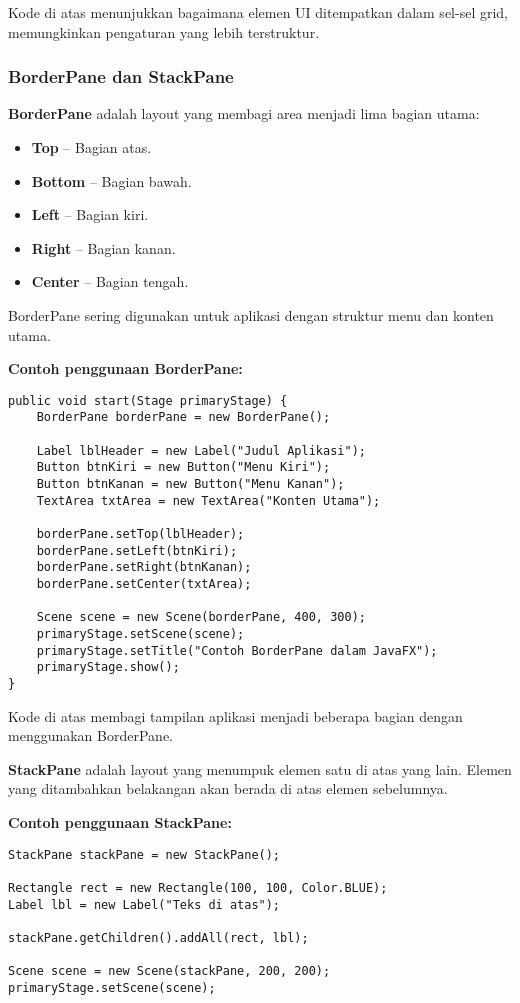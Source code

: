 Kode di atas menunjukkan bagaimana elemen UI ditempatkan dalam sel-sel grid, memungkinkan pengaturan yang lebih terstruktur.

\subsubsection{BorderPane dan StackPane}

\textbf{BorderPane} adalah layout yang membagi area menjadi lima bagian utama:
\begin{itemize}
\item \textbf{Top} – Bagian atas.
\item \textbf{Bottom} – Bagian bawah.
\item \textbf{Left} – Bagian kiri.
\item \textbf{Right} – Bagian kanan.
\item \textbf{Center} – Bagian tengah.
\end{itemize}

BorderPane sering digunakan untuk aplikasi dengan struktur menu dan konten utama.

\textbf{Contoh penggunaan BorderPane:}
\begin{lstlisting}[style=JavaStyle, caption=Menggunakan BorderPane dalam JavaFX]
public void start(Stage primaryStage) {
	BorderPane borderPane = new BorderPane();
	
	Label lblHeader = new Label("Judul Aplikasi");
	Button btnKiri = new Button("Menu Kiri");
	Button btnKanan = new Button("Menu Kanan");
	TextArea txtArea = new TextArea("Konten Utama");
	
	borderPane.setTop(lblHeader);
	borderPane.setLeft(btnKiri);
	borderPane.setRight(btnKanan);
	borderPane.setCenter(txtArea);
	
	Scene scene = new Scene(borderPane, 400, 300);
	primaryStage.setScene(scene);
	primaryStage.setTitle("Contoh BorderPane dalam JavaFX");
	primaryStage.show();
}
\end{lstlisting}


Kode di atas membagi tampilan aplikasi menjadi beberapa bagian dengan menggunakan BorderPane.

\textbf{StackPane} adalah layout yang menumpuk elemen satu di atas yang lain. Elemen yang ditambahkan belakangan akan berada di atas elemen sebelumnya.

\textbf{Contoh penggunaan StackPane:}
\begin{lstlisting}[style=JavaStyle, caption=Menumpuk elemen menggunakan StackPane]
StackPane stackPane = new StackPane();

Rectangle rect = new Rectangle(100, 100, Color.BLUE);
Label lbl = new Label("Teks di atas");

stackPane.getChildren().addAll(rect, lbl);

Scene scene = new Scene(stackPane, 200, 200);
primaryStage.setScene(scene);
\end{lstlisting}

